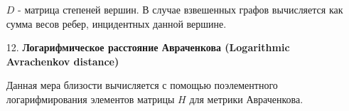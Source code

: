 \begin{itemize}
$D$ - матрица степеней вершин. В случае взвешенных графов вычисляется как сумма весов ребер, инцидентных данной вершине.


\item[12.] \textbf{Логарифмическое расстояние Авраченкова (Logarithmic Avrachenkov distance)}

Данная мера близости вычисляется с помощью поэлементного логарифмирования элементов матрицы $H$ для метрики Авраченкова. 

\end{itemize}


\clearpage
